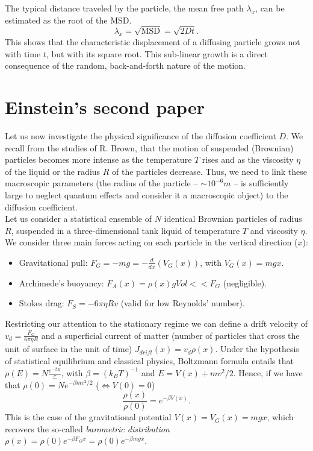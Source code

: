The typical distance traveled by the particle, the mean free path  $\lambda_x$, can be estimated as the root of the MSD.
\[
\lambda_x = \sqrt{\text{MSD}} = \sqrt{2Dt}.
\]
This shows that the characteristic displacement of a diffusing particle grows not with time $t$, but with its square root. This sub-linear growth is a direct consequence of the random, back-and-forth nature of the motion.

\section{Einstein's second paper}

Let us now investigate the physical significance of the diffusion coefficient $D$. We recall from the studies of R. Brown, that the motion of suspended (Brownian) particles becomes more intense as the temperature $T$ rises and as the viscosity $\eta$ of the liquid or the radius $R$ of the particles decrease. Thus, we need to link these macroscopic parameters (the radius of the particle -- $\sim10^{-6}m$ -- is sufficiently large to neglect quantum effects and consider it a macroscopic object) to the diffusion coefficient.\\
Let us consider a statistical ensemble of $N$ identical Brownian particles of radius $R$, suspended in a three-dimensional tank liquid of temperature $T$ and viscosity $\eta$. We consider three main forces acting on each particle in the vertical direction ($x$):
\begin{itemize}
	\item Gravitational pull: $F_G=-mg=-\frac{d}{dx}(V_G(x))$, with $V_G(x)=mgx$.
	\item Archimede's buoyancy: $F_A(x)=\rho(x) g Vol<<F_G$ (negligible).
	\item Stokes drag: $F_S=-6\pi\eta R v $ (valid for low Reynolds' number).
\end{itemize}
Restricting our attention to the stationary regime we can define a drift velocity of $v_d=\frac{F_G}{6\pi \eta R}$ and a superficial current of matter (number of particles that cross the unit of surface in the unit of time) $J_{drift}(x)=v_d\rho(x)$. Under the hypothesis of statistical equilibrium and classical physics, Boltzmann formula entails that $\rho(E)=N\frac{e^{-\beta E}}{\mathcal{Z}}$, with $\beta=(k_BT)^{-1}$ and $E=V(x)+mv^2/2$. Hence, if we have that $\rho(0)=Ne^{-\beta m v^2/2}$ ($\iff V(0)=0$)
\[
	\frac{\rho(x)}{\rho(0)}=e^{-\beta V(x)}.
\]
This is the case of the gravitational potential $V(x)=V_G(x)=mgx$, which recovers the so-called \textit{barometric distribution} $\rho(x)=\rho(0)e^{-\beta F_G x}=\rho(0)e^{-\beta m g x}$.\\
